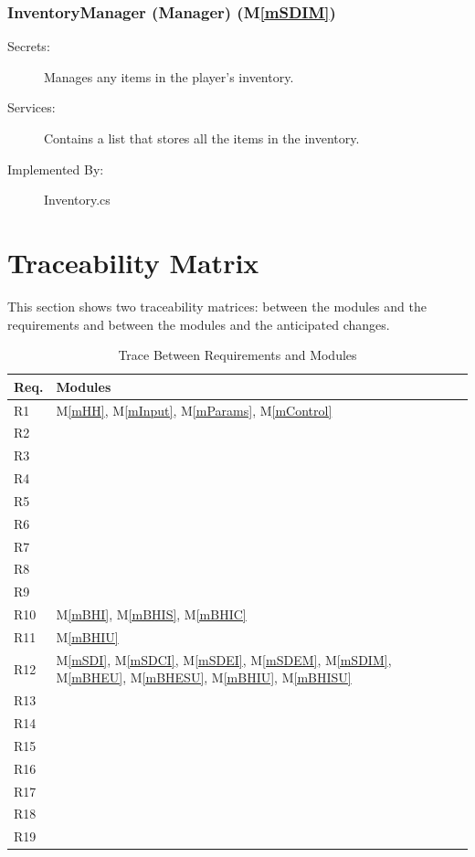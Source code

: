 \documentclass[12pt, titlepage]{article}
\newcommand{\mref}[1]{M\ref{#1}}
\begin{document}
\subsubsection{InventoryManager (Manager) (\mref{mSDIM})}

\begin{description}
\item[Secrets:] Manages any items in the player's inventory.
\item[Services:] Contains a list that stores all the items in the inventory.
\item[Implemented By:] Inventory.cs
\end{description}

\section{Traceability Matrix} \label{SecTM}

This section shows two traceability matrices: between the modules and the
requirements and between the modules and the anticipated changes.

\begin{table}[H]
\centering
\begin{tabular}{p{} p{}}
\toprule
\textbf{Req.} & \textbf{Modules}\\
\midrule
R1 & \mref{mHH}, \mref{mInput}, \mref{mParams}, \mref{mControl}\\
R2 &  \\
R3 &  \\
R4 &  \\
R5 &  \\
R6 &  \\
R7 &  \\
R8 &  \\
R9 &  \\
R10 & \mref{mBHI}, \mref{mBHIS},  \mref{mBHIC}  \\
R11 & \mref{mBHIU} \\
R12 & \mref{mSDI}, \mref{mSDCI}, \mref{mSDEI}, \mref{mSDEM}, \mref{mSDIM}, \mref{mBHEU}, \mref{mBHESU}, \mref{mBHIU}, \mref{mBHISU}\\
R13 &  \\
R14 &  \\
R15 &  \\
R16 &  \\
R17 &  \\
R18 &  \\
R19 &  \\
\bottomrule
\end{tabular}
\caption{Trace Between Requirements and Modules}
\label{TblRT}
\end{table}
\end{document}
